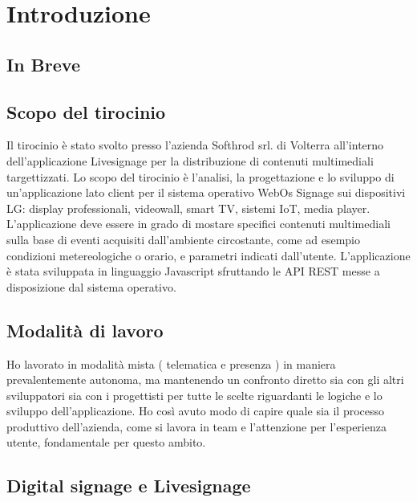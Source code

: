\chapter{Introduzione} 
\linespread{1.5}

\section{In Breve}

\section{Scopo del tirocinio}

Il tirocinio è stato svolto presso l'azienda Softhrod srl. di Volterra all'interno dell'applicazione Livesignage per la distribuzione di contenuti multimediali targettizzati. Lo scopo del tirocinio è l'analisi, la progettazione e lo sviluppo di un'applicazione lato client per il sistema operativo WebOs Signage sui dispositivi LG:  display professionali, videowall, smart TV, sistemi IoT, media player. L'applicazione deve essere in grado di mostare specifici contenuti multimediali sulla base di eventi acquisiti dall'ambiente circostante, come ad esempio condizioni metereologiche o orario, e parametri indicati dall'utente. L'applicazione è stata sviluppata in linguaggio Javascript sfruttando le API REST messe a disposizione dal sistema operativo.

\section{Modalità di lavoro}

Ho lavorato in modalità mista ( telematica e presenza ) in maniera prevalentemente autonoma, ma mantenendo un confronto diretto sia con gli altri sviluppatori sia con i progettisti per tutte le scelte riguardanti le logiche e lo sviluppo dell'applicazione. Ho così avuto modo di capire quale sia il processo produttivo dell'azienda, come si lavora in team e l'attenzione per l'esperienza utente, fondamentale per questo ambito.

\section{Digital signage e Livesignage}

